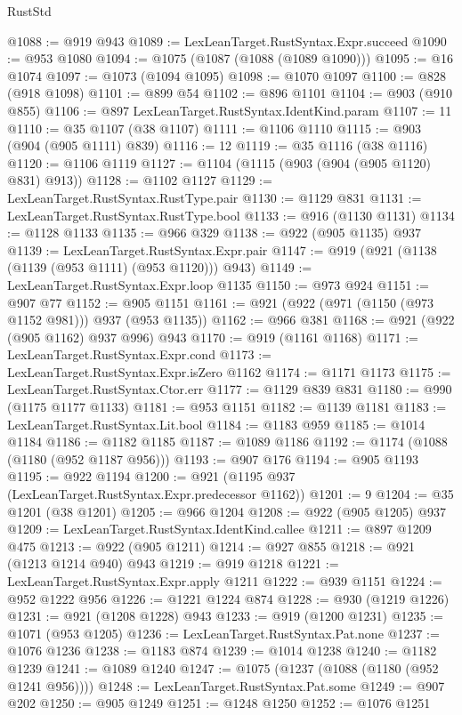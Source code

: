 \begin{lexlean}{RustStd}
\begin{coremodule}
@1088 := @919 @943
@1089 := LexLeanTarget.RustSyntax.Expr.succeed
@1090 := @953 @1080
@1094 := @1075 (@1087 (@1088 (@1089 @1090)))
@1095 := @16 @1074
@1097 := @1073 (@1094 @1095)
@1098 := @1070 @1097
@1100 := @828 (@918 @1098)
@1101 := @899 @54
@1102 := @896 @1101
@1104 := @903 (@910 @855)
@1106 := @897 LexLeanTarget.RustSyntax.IdentKind.param
@1107 := 11
@1110 := @35 @1107 (@38 @1107)
@1111 := @1106 @1110
@1115 := @903 (@904 (@905 @1111) @839)
@1116 := 12
@1119 := @35 @1116 (@38 @1116)
@1120 := @1106 @1119
@1127 := @1104 (@1115 (@903 (@904 (@905 @1120) @831) @913))
@1128 := @1102 @1127
@1129 := LexLeanTarget.RustSyntax.RustType.pair
@1130 := @1129 @831
@1131 := LexLeanTarget.RustSyntax.RustType.bool
@1133 := @916 (@1130 @1131)
@1134 := @1128 @1133
@1135 := @966 @329
@1138 := @922 (@905 @1135) @937
@1139 := LexLeanTarget.RustSyntax.Expr.pair
@1147 := @919 (@921 (@1138 (@1139 (@953 @1111) (@953 @1120))) @943)
@1149 := LexLeanTarget.RustSyntax.Expr.loop @1135
@1150 := @973 @924
@1151 := @907 @77
@1152 := @905 @1151
@1161 := @921 (@922 (@971 (@1150 (@973 @1152 @981))) @937 (@953 @1135))
@1162 := @966 @381
@1168 := @921 (@922 (@905 @1162) @937 @996) @943
@1170 := @919 (@1161 @1168)
@1171 := LexLeanTarget.RustSyntax.Expr.cond
@1173 := LexLeanTarget.RustSyntax.Expr.isZero @1162
@1174 := @1171 @1173
@1175 := LexLeanTarget.RustSyntax.Ctor.err
@1177 := @1129 @839 @831
@1180 := @990 (@1175 @1177 @1133)
@1181 := @953 @1151
@1182 := @1139 @1181
@1183 := LexLeanTarget.RustSyntax.Lit.bool
@1184 := @1183 @959
@1185 := @1014 @1184
@1186 := @1182 @1185
@1187 := @1089 @1186
@1192 := @1174 (@1088 (@1180 (@952 @1187 @956)))
@1193 := @907 @176
@1194 := @905 @1193
@1195 := @922 @1194
@1200 := @921 (@1195 @937 (LexLeanTarget.RustSyntax.Expr.predecessor @1162))
@1201 := 9
@1204 := @35 @1201 (@38 @1201)
@1205 := @966 @1204
@1208 := @922 (@905 @1205) @937
@1209 := LexLeanTarget.RustSyntax.IdentKind.callee
@1211 := @897 @1209 @475
@1213 := @922 (@905 @1211)
@1214 := @927 @855
@1218 := @921 (@1213 @1214 @940) @943
@1219 := @919 @1218
@1221 := LexLeanTarget.RustSyntax.Expr.apply @1211
@1222 := @939 @1151
@1224 := @952 @1222 @956
@1226 := @1221 @1224 @874
@1228 := @930 (@1219 @1226)
@1231 := @921 (@1208 @1228) @943
@1233 := @919 (@1200 @1231)
@1235 := @1071 (@953 @1205)
@1236 := LexLeanTarget.RustSyntax.Pat.none
@1237 := @1076 @1236
@1238 := @1183 @874
@1239 := @1014 @1238
@1240 := @1182 @1239
@1241 := @1089 @1240
@1247 := @1075 (@1237 (@1088 (@1180 (@952 @1241 @956))))
@1248 := LexLeanTarget.RustSyntax.Pat.some
@1249 := @907 @202
@1250 := @905 @1249
@1251 := @1248 @1250
@1252 := @1076 @1251

\end{coremodule}
\end{lexlean}
